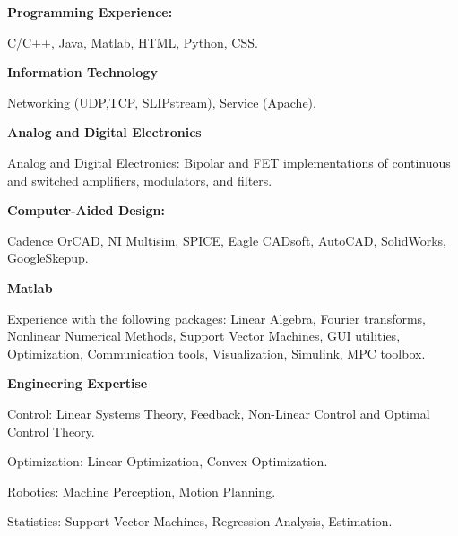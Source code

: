 \documentclass[10pt]{article}
\newenvironment{innerlist}[1][\enskip\textbullet]%
        {\begin{compactitem}[#1]}{\end{compactitem}}
\begin{document}
\textbf{Programming Experience:}
\begin{innerlist}
	\item C/C++, Java, Matlab, HTML, Python, CSS. \\
\end{innerlist}

\textbf{Information Technology}
\begin{innerlist}
	\item Networking (UDP,TCP, SLIPstream), Service (Apache).\\
\end{innerlist}

\textbf{Analog and Digital Electronics}
\begin{innerlist}
	\item Analog and Digital Electronics: Bipolar and FET implementations of continuous and switched amplifiers, modulators, and filters.\\ \end{innerlist}

\textbf{Computer-Aided Design:}
\begin{innerlist}
	\item Cadence OrCAD, NI Multisim, SPICE, Eagle CADsoft, AutoCAD, SolidWorks, GoogleSkepup.\\
\end{innerlist}

\textbf{Matlab}
\begin{innerlist}
    \item Experience with the following packages: Linear Algebra, Fourier transforms, Nonlinear Numerical Methods, Support Vector Machines, GUI utilities, Optimization, Communication tools, Visualization, Simulink, MPC toolbox.\\
\end{innerlist}

\textbf{Engineering Expertise}
\begin{innerlist}
	\item Control: Linear Systems Theory, Feedback, Non-Linear Control and Optimal Control Theory.
	\item Optimization: Linear Optimization, Convex Optimization. 
	\item Robotics: Machine Perception, Motion Planning.
	\item Statistics: Support Vector Machines, Regression Analysis, Estimation.\\
\end{innerlist}
\end{document}
